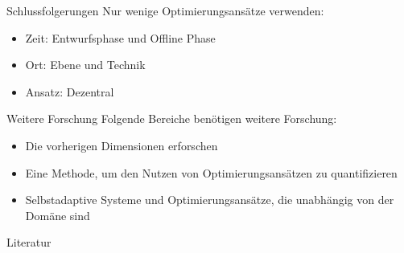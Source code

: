 \documentclass[de,16:9]{sdqbeamer}
\begin{document}
\begin{frame}{Schlussfolgerungen}
	Nur wenige Optimierungsansätze verwenden:
	\begin{itemize}
		\item Zeit: Entwurfsphase und Offline Phase
		\item Ort: Ebene und Technik
		\item Ansatz: Dezentral
	\end{itemize}
\end{frame}

\begin{frame}{Weitere Forschung}
	Folgende Bereiche benötigen weitere Forschung:
	\begin{itemize}
		\item Die vorherigen Dimensionen erforschen
		\item Eine Methode, um den Nutzen von Optimierungsansätzen zu quantifizieren
		\item Selbstadaptive Systeme und Optimierungsansätze, die unabhängig von der Domäne sind
	\end{itemize}
\end{frame}

\appendix
\beginbackup

\begin{frame}{Literatur}
\printbibliography
\end{frame}



\end{document}
